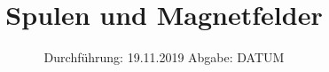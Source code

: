 
\usepackage{amssymb}
\subject{308}
\title{Spulen und Magnetfelder}
\date{%
  Durchführung: 19.11.2019
  \hspace{3em}
  Abgabe: DATUM
}



\maketitle
\thispagestyle{empty}
\tableofcontents
\newpage







\printbibliography{}


